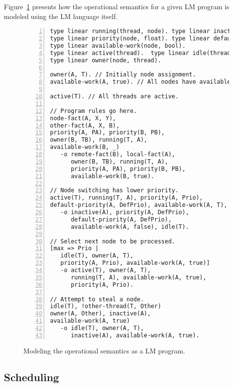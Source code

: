 Figure~\ref{code:threads:modeling} presents how the operational semantics for a
given LM program is modeled using the LM language itself.

\begin{figure}[h!]
\begin{Verbatim}[numbers=left,fontsize=\codesize,commandchars=*\#\&]
type linear running(thread, node). type linear inactive(node).
type linear priority(node, float). type linear default-priority(node, float).
type linear available-work(node, bool).
type linear active(thread).  type linear idle(thread).
type linear owner(node, thread).

owner(A, T). // Initially node assignment.
available-work(A, true). // All nodes have available work.

active(T). // All threads are active.

// Program rules go here.
node-fact(A, X, Y),
other-fact(A, X, B),
priority(A, PA), priority(B, PB),
owner(B, TB), running(T, A),
available-work(B, _)
   -o remote-fact(B), local-fact(A),
      owner(B, TB), running(T, A),
      priority(A, PA), priority(B, PB),
      available-work(B, true).

// Node switching has lower priority.
active(T), running(T, A), priority(A, Prio),
default-priority(A, DefPrio), available-work(A, T),
   -o inactive(A), priority(A, DefPrio),
      default-priority(A, DefPrio),
      available-work(A, false), idle(T).

// Select next node to be processed.
[max => Prio |
   idle(T), owner(A, T),
   priority(A, Prio), available-work(A, true)]
   -o active(T), owner(A, T),
      running(T, A), available-work(A, true),
      priority(A, Prio).

// Attempt to steal a node.
idle(T), !other-thread(T, Other)
owner(A, Other), inactive(A),
available-work(A, true)
   -o idle(T), owner(A, T),
      inactive(A), available-work(A, true).
\end{Verbatim}
\caption{Modeling the operational semantics as a LM program.}
\label{code:threads:modeling}
\end{figure}


\subsection{Scheduling}

